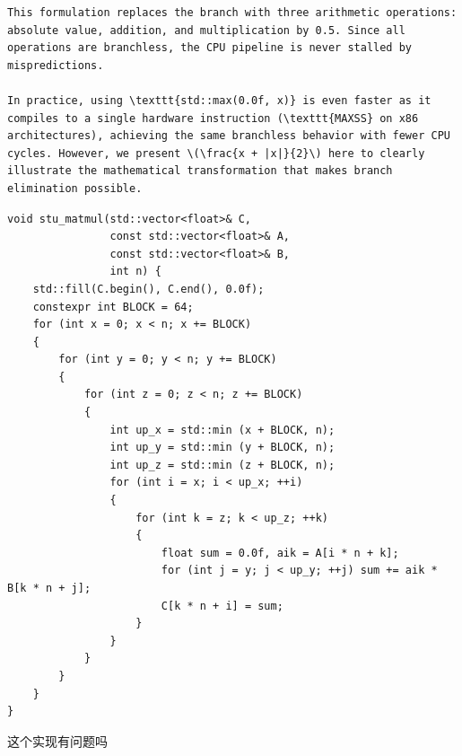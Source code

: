\documentclass[11pt, a4paper]{article}
\begin{document}
\begin{aibox}
\begin{tcolorbox}[colback=white,colframe=gray!50!white,boxrule=0.5pt,arc=2pt,left=5pt,right=5pt,top=5pt,bottom=5pt]
\begin{verbatim}
This formulation replaces the branch with three arithmetic operations: absolute value, addition, and multiplication by 0.5. Since all operations are branchless, the CPU pipeline is never stalled by mispredictions. 

In practice, using \texttt{std::max(0.0f, x)} is even faster as it compiles to a single hardware instruction (\texttt{MAXSS} on x86 architectures), achieving the same branchless behavior with fewer CPU cycles. However, we present \(\frac{x + |x|}{2}\) here to clearly illustrate the mathematical transformation that makes branch elimination possible.
\end{verbatim}
\end{tcolorbox}
\end{aibox}

\vspace{1.5em}

\begin{userbox}
\begin{verbatim}
void stu_matmul(std::vector<float>& C,
                const std::vector<float>& A,
                const std::vector<float>& B,
                int n) {
    std::fill(C.begin(), C.end(), 0.0f);
    constexpr int BLOCK = 64;
    for (int x = 0; x < n; x += BLOCK)
    {
        for (int y = 0; y < n; y += BLOCK)
        {
            for (int z = 0; z < n; z += BLOCK)
            {
                int up_x = std::min (x + BLOCK, n);
                int up_y = std::min (y + BLOCK, n);
                int up_z = std::min (z + BLOCK, n);
                for (int i = x; i < up_x; ++i)
                {
                    for (int k = z; k < up_z; ++k)
                    {
                        float sum = 0.0f, aik = A[i * n + k];
                        for (int j = y; j < up_y; ++j) sum += aik * B[k * n + j];
                        C[k * n + i] = sum;
                    }
                }
            }
        }
    }
}
\end{verbatim}

这个实现有问题吗
\end{userbox}
\end{document}
